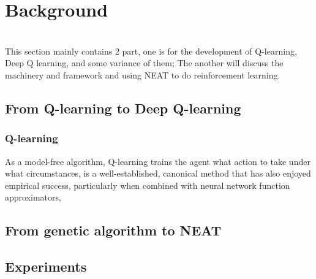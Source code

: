 \documentclass[journal]{IEEEtran}
\begin{document}
 

\section{Background}
\ \\
This section mainly contains 2 part, one is for the development of Q-learning, Deep Q learning, and some variance of them; The another will discuss the 
machinery and framework and using NEAT to do reinforcement learning.


\subsection{From Q-learning to Deep Q-learning}

\subsubsection{Q-learning}

 As a model-free algorithm, Q-learning trains the agent what action to take under what circumstances, is a well-established, canonical method that has also enjoyed empirical success,
 particularly when combined with neural network function approximators, 



  


\subsection{From genetic algorithm to NEAT}



\subsubsection{}







\subsection{Experiments}
\end{document}
